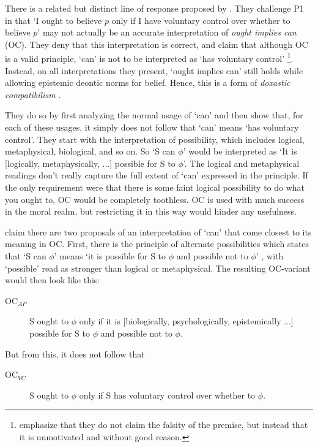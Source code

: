 \documentclass[12pt,numbers=noenddot]{scrartcl}
\begin{document}
There is a related but distinct line of response proposed by \textcite{Chuard2009-CHUENW}. They challenge P1 in that ‘I ought to believe $p$ only if I have voluntary control over whether to believe $p$’ may not actually be an accurate interpretation of \emph{ought implies can} (OC). They deny that this interpretation is correct, and claim that although OC is a valid principle, ‘can’ is not to be interpreted as ‘has voluntary control’
\footnote{\textcite[601]{Chuard2009-CHUENW} emphasize that they do not claim the falsity of the premise, but instead that it is unmotivated and without good reason.}.
Instead, on all interpretations they present, ‘ought implies can’ still holds while allowing epistemic deontic norms for belief. Hence, this is a form of \emph{doxastic compatibilism} \autocite[682]{Peels2014-PEEADC}.

They do so by first analyzing the normal usage of ‘can’ and then show that, for each of these usages, it simply does not follow that ‘can’ means ‘has voluntary control’. They start with the interpretation of possibility, which includes logical, metaphysical, biological, and so on. So ‘S can $\phi$’ would be interpreted as ‘It is [logically, metaphysically, ...] possible for S to $\phi$’. The logical and metaphysical readings don't really capture the full extent of ‘can’ expressed in the principle. If the only requirement were that there is some faint logical possibility to do what you ought to, OC would be completely toothless. OC is used with much success in the moral realm, but restricting it in this way would hinder any usefulness.

 \textcite[616]{Chuard2009-CHUENW} claim there are two proposals of an interpretation of ‘can’ that come closest to its meaning in OC. First, there is the principle of alternate possibilities which states that ‘S can $\phi$’ means ‘it is possible for S to $\phi$ and possible not to $\phi$’ \autocite[615]{Chuard2009-CHUENW}, with ‘possible’ read as stronger than logical or metaphysical. The resulting OC-variant would then look like this:

 \begin{description}
    \item[OC$_{AP}$] S ought to $\phi$ only if it is [biologically, psychologically, epistemically ...] possible for S to $\phi$ and possible not to $\phi$.
 \end{description}

But from this, it does not follow that
\begin{description}
    \item[OC$_{VC}$] S ought to $\phi$ only if S has voluntary control over whether to $\phi$.
 \end{description}
\end{document}
